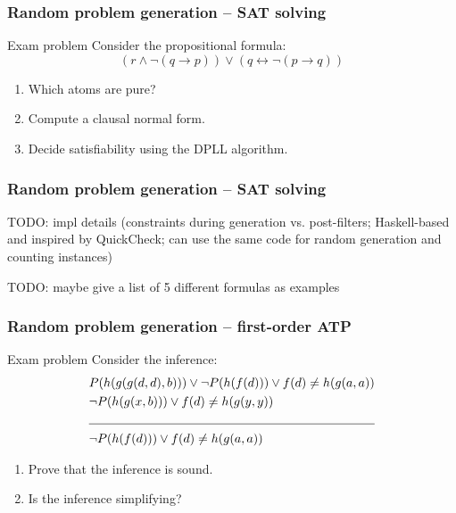 \documentclass[xcolor={table}]{beamer}
\newcommand{\limpl}{\rightarrow}
\newcommand{\liff}{\leftrightarrow}
\begin{document}
\begin{frame}
    \frametitle{Random problem generation -- SAT solving}

    \begin{block}{Exam problem}
        Consider the propositional formula:
        \[
            (r \land \lnot (q \limpl p)) \lor (q \liff \lnot (p \limpl q))
        \]
        \vspace*{-1.5em}
        \begin{enumerate}
            \item Which atoms are pure?
            \item Compute a clausal normal form.
            \item Decide satisfiability using the DPLL algorithm.
        \end{enumerate}
    \end{block}
\end{frame}

\begin{frame}
    \frametitle{Random problem generation -- SAT solving}

    TODO: impl details
    (constraints during generation vs. post-filters;
    Haskell-based and inspired by QuickCheck;
    can use the same code for random generation and counting instances)

    TODO: maybe give a list of 5 different formulas as examples
\end{frame}



\begin{frame}
    \frametitle{Random problem generation -- first-order ATP}

    \begin{block}{Exam problem}
        Consider the inference:
        \begin{align*}
            & P(h(g(g(d,d),b))) \lor \lnot P(h(f(d))) \lor f(d) \neq h(g(a,a)) \\
            & \lnot P(h(g(x,b))) \lor f(d) \neq h(g(y,y)) \\
            \cline{1-2}
            & \lnot P(h(f(d))) \lor f(d) \neq h(g(a,a))
        \end{align*}
        \vspace*{-1.5em}
        \begin{enumerate}
            \item Prove that the inference is sound.
            \item Is the inference simplifying?
        \end{enumerate}
    \end{block}
\end{frame}
\end{document}
